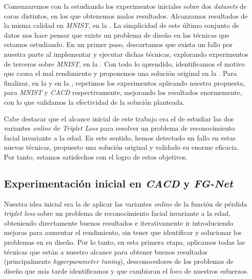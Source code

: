 Comenzaremos con la  estudiando los experimentos iniciales sobre dos \textit{datasets} de caras distintos, en los que obtenemos malos resultados. Alcanzamos resultados de la misma calidad en \textit{MNIST}, en la . La simplicidad de este último conjunto de datos nos hace pensar que existe un problema de diseño en las técnicas que estamos estudiando. En un primer paso, descartamos que exista un fallo por nuestra parte al implementar y ejecutar dichas técnicas, explorando experimentos de terceros sobre \textit{MNIST}, en la  . Con todo lo aprendido, identificamos el motivo que causa el mal rendimiento y proponemos una solución original en la . Para finalizar, en la  y en la , repetimos los experimentos aplicando nuestra propuesta, para \textit{MNIST} y \textit{CACD} respectivamente, mejorando los resultados enormemente, con lo que validamos la efectividad de la solución planteada.

Cabe destacar que el alcance inicial de este trabajo era el de estudiar las dos variantes \textit{online} de \textit{Triplet Loss} para resolver un problema de reconocimiento facial invariante a la edad. En este sentido, hemos detectado un fallo en estas nuevas técnicas, propuesto una solución original y validado su enorme eficacia. Por tanto, estamos satisfechos con el logro de estos objetivos.

\subsection{Experimentación inicial en \textit{CACD} y \textit{FG-Net}} \label{isubsec:experimentacion_inicial}

Nuestra idea inicial era la de aplicar las variantes \textit{online} de la función de pérdida \textit{triplet loss} sobre un problema de reconocimiento facial invariante a la edad, obteniendo directamente buenos resultados e iterativamente ir introduciendo mejoras para aumentar el rendimiento, sin tener que identificar y solucionar los problemas en su diseño. Por lo tanto, en esta primera etapa, aplicamos todas las técnicas que están a nuestro alcance para obtener buenos resultados (principalmente \textit{hyperparameter tuning}), desconocedores de los problemas de diseño que más tarde identificamos y que cambiaran el foco de nuestros esfuerzos.

